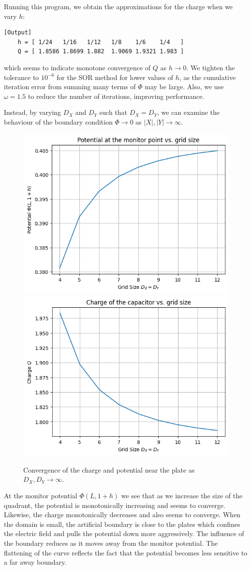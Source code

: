 \documentclass{article}
\begin{document}
Running this program, we obtain the approximations for the charge when we vary \(h\):
\begin{verbatim}[Output]
    h = [ 1/24   1/16   1/12   1/8    1/6    1/4   ]
    Q = [ 1.8586 1.8699 1.882  1.9069 1.9321 1.983 ]
\end{verbatim}
which seems to indicate monotone convergence of \(Q\) as \(h \to 0\). We tighten the tolerance to \(10^{-6}\) for the SOR method for lower values of \(h\), as the cumulative iteration error from summing many terms of \(\Phi\) may be large. Also, we use \(\omega = 1.5\) to reduce the number of iterations, improving performance.

Instead, by varying \(D_X\) and \(D_Y\) such that \(D_X = D_Y\), we can examine the behaviour of the boundary condition \(\Phi \to 0\) as \(|X|, |Y| \to \infty\).

\begin{figure}
    \centering
    \includegraphics[width=0.49\linewidth]{images/monitor4.png}
    \includegraphics[width=0.49\linewidth]{images/charge4.png}
    \caption{Convergence of the charge and potential near the plate as \(D_X,D_Y \to \infty\).}
\end{figure}

At the monitor potential \(\Phi(L, 1+h)\) we see that as we increase the size of the quadrant, the potential is monotonically increasing and seems to converge. Likewise, the charge monotonically decreases and also seems to converge. When the domain is small, the artificial boundary is close to the plates which confines the electric field and pulls the potential down more aggressively. The influence of the boundary reduces as it moves away from the monitor potential. The flattening of the curve reflects the fact that the potential becomes less sensitive to a far away boundary. 
\end{document}
